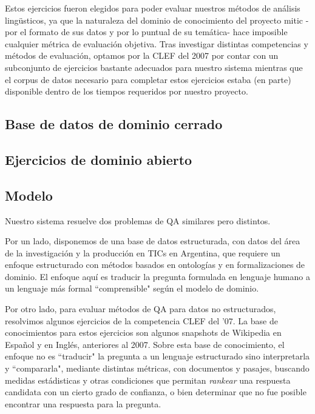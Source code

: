 Estos ejercicios fueron elegidos para poder evaluar nuestros métodos de análisis lingüsticos,
ya que la naturaleza del dominio de conocimiento del proyecto mitic - por el formato de sus datos
 y por lo puntual de su temática- hace imposible cualquier métrica de evaluación objetiva.
Tras investigar distintas competencias y métodos de evaluación, optamos por la CLEF del 2007
por contar con un subconjunto de ejercicios bastante adecuados para nuestro sistema mientras que el corpus
de datos necesario para completar estos ejercicios estaba (en parte) disponible dentro de los tiempos 
requeridos por nuestro proyecto. 

\subsection{Base de datos de dominio cerrado}
\subsection{Ejercicios de dominio abierto}
\bigskip

\subsection{Modelo}

Nuestro sistema resuelve dos problemas de QA similares pero distintos. 

Por un lado, disponemos de una base de datos estructurada, con datos del área de la investigación y la
producción en TICs en Argentina, que requiere un enfoque estructurado con métodos basados en ontologías y en 
formalizaciones de dominio. El enfoque aquí es traducir la pregunta formulada en lenguaje humano a un lenguaje más
formal ``comprensible" según el modelo de dominio. 

Por otro lado, para evaluar métodos de QA 
para datos no estructurados, resolvimos algunos ejercicios de la competencia CLEF del '07. La base de conocimientos para
estos ejercicios son algunos snapshots de Wikipedia en Espa\~nol y en Inglés, anteriores al 2007. Sobre esta base de conocimiento,
el enfoque no es ``traducir" la pregunta a un lenguaje estructurado sino interpretarla y ``compararla", mediante distintas métricas, 
con documentos y pasajes, buscando medidas estádisticas y otras condiciones que permitan \textit{rankear} una respuesta candidata
con un cierto grado de confianza, o bien determinar que no fue posible encontrar una respuesta para la pregunta. 


